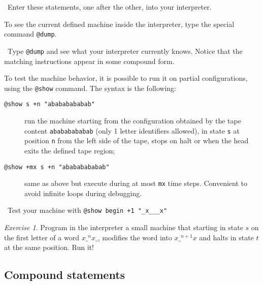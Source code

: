 \documentclass[a4paper,11pt]{article}
\theoremstyle{remark}
\newtheorem{exercise}{Exercise}
\newcommand\doit[1]{\medskip\par\noindent\ding{229}~\textsf{#1}}
\begin{document}
\vspace{-3ex}
\doit{Enter these statements, one after the other, into your interpreter.}

\medskip
To see the current defined machine inside the interpreter, type the special command \verb+@dump+.

\doit{Type \texttt{@dump} and see what your interpreter currently knows. Notice that the
matching instructions appear in some compound form.}

\medskip
To test the machine behavior, it is possible to run it on partial configurations, using the 
\verb+@show+ command. The syntax is the following:
\begin{description}
	\item[\texttt{@show s +n "abababababab"}] run the machine starting from the configuration
	obtained by the tape content \texttt{abababababab} (only 1 letter identifiers allowed), in
	state \texttt{s} at position \texttt{n} from the left side of the tape, stops on halt
	or when the head exits the defined tape region;
	\item[\texttt{@show +mx s +n "abababababab"}] same as above but execute during at most
	\texttt{mx} time steps. Convenient to avoid infinite loops during debugging.
\end{description}

\doit{Test your machine with \texttt{@show begin +1 "\_x\_\_\_x"}}

\begin{exercise}\label{ex:s}
Program in the interpreter a small machine that starting in state $s$ on the first letter of
a word $x{\_}^{n}x\_$, modifies the word into $x{\_}^{n+1}x$ and halts in state $t$ at the 
same position. Run it!
\end{exercise}

\subsection{Compound statements}
\end{document}
